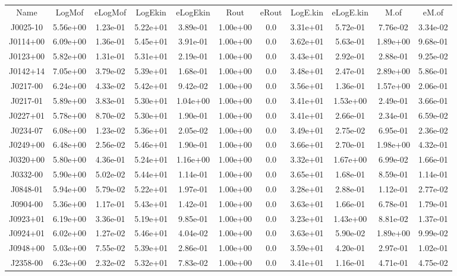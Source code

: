 \begin{table}
\begin{tabular}{ccccccccccc}
Name & LogMof & eLogMof & LogEkin & eLogEkin & Rout & eRout & LogE.kin & eLogE.kin & M.of & eM.of \\
J0025-10 & 5.56e+00 & 1.23e-01 & 5.22e+01 & 3.89e-01 & 1.00e+00 & 0.0 & 3.31e+01 & 5.72e-01 & 7.76e-02 & 3.34e-02 \\
J0114+00 & 6.09e+00 & 1.36e-01 & 5.45e+01 & 3.91e-01 & 1.00e+00 & 0.0 & 3.62e+01 & 5.63e-01 & 1.89e+00 & 9.68e-01 \\
J0123+00 & 5.82e+00 & 1.31e-01 & 5.31e+01 & 2.19e-01 & 1.00e+00 & 0.0 & 3.43e+01 & 2.92e-01 & 2.88e-01 & 9.25e-02 \\
J0142+14 & 7.05e+00 & 3.79e-02 & 5.39e+01 & 1.68e-01 & 1.00e+00 & 0.0 & 3.48e+01 & 2.47e-01 & 2.89e+00 & 5.86e-01 \\
J0217-00 & 6.24e+00 & 4.33e-02 & 5.42e+01 & 9.42e-02 & 1.00e+00 & 0.0 & 3.56e+01 & 1.36e-01 & 1.57e+00 & 2.06e-01 \\
J0217-01 & 5.89e+00 & 3.83e-01 & 5.30e+01 & 1.04e+00 & 1.00e+00 & 0.0 & 3.41e+01 & 1.53e+00 & 2.49e-01 & 3.66e-01 \\
J0227+01 & 5.78e+00 & 8.70e-02 & 5.30e+01 & 1.90e-01 & 1.00e+00 & 0.0 & 3.41e+01 & 2.66e-01 & 2.34e-01 & 6.59e-02 \\
J0234-07 & 6.08e+00 & 1.23e-02 & 5.36e+01 & 2.05e-02 & 1.00e+00 & 0.0 & 3.49e+01 & 2.75e-02 & 6.95e-01 & 2.36e-02 \\
J0249+00 & 6.48e+00 & 2.56e-02 & 5.46e+01 & 1.90e-01 & 1.00e+00 & 0.0 & 3.66e+01 & 2.70e-01 & 1.98e+00 & 4.32e-01 \\
J0320+00 & 5.80e+00 & 4.36e-01 & 5.24e+01 & 1.16e+00 & 1.00e+00 & 0.0 & 3.32e+01 & 1.67e+00 & 6.99e-02 & 1.66e-01 \\
J0332-00 & 5.90e+00 & 5.02e-02 & 5.44e+01 & 1.14e-01 & 1.00e+00 & 0.0 & 3.65e+01 & 1.68e-01 & 8.59e-01 & 1.14e-01 \\
J0848-01 & 5.94e+00 & 5.79e-02 & 5.22e+01 & 1.97e-01 & 1.00e+00 & 0.0 & 3.28e+01 & 2.88e-01 & 1.12e-01 & 2.77e-02 \\
J0904-00 & 5.36e+00 & 1.17e-01 & 5.43e+01 & 1.42e-01 & 1.00e+00 & 0.0 & 3.63e+01 & 1.66e-01 & 6.78e-01 & 1.79e-01 \\
J0923+01 & 6.19e+00 & 3.36e-01 & 5.19e+01 & 9.85e-01 & 1.00e+00 & 0.0 & 3.23e+01 & 1.43e+00 & 8.81e-02 & 1.37e-01 \\
J0924+01 & 6.02e+00 & 1.27e-02 & 5.46e+01 & 4.04e-02 & 1.00e+00 & 0.0 & 3.63e+01 & 5.90e-02 & 1.89e+00 & 9.99e-02 \\
J0948+00 & 5.03e+00 & 7.55e-02 & 5.39e+01 & 2.86e-01 & 1.00e+00 & 0.0 & 3.59e+01 & 4.20e-01 & 2.97e-01 & 1.02e-01 \\
J2358-00 & 6.23e+00 & 2.32e-02 & 5.32e+01 & 7.83e-02 & 1.00e+00 & 0.0 & 3.41e+01 & 1.16e-01 & 4.71e-01 & 4.75e-02 \\
\end{tabular}
\end{table}
